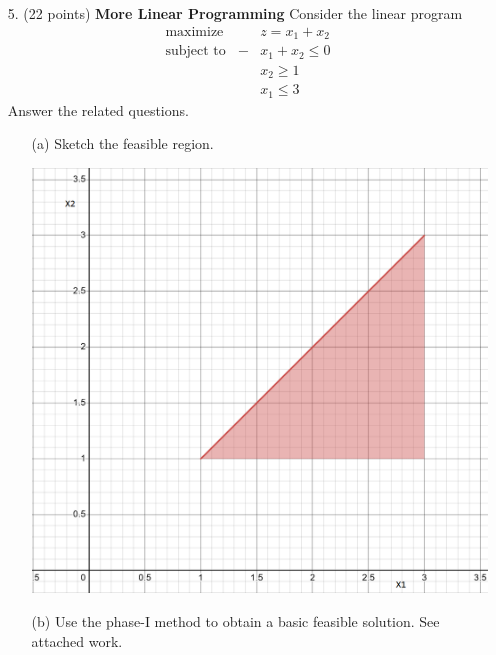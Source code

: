 \documentclass{article}
\begin{document}
\begin{itemize}
    \item[5.] (22 points) \textbf{More Linear Programming}
    \newline\newline
    Consider the linear program
    \begin{align*}
        \text{maximize} \:\:\:\:\: &z = x_1 + x_2\\
        \text{subject to} \:\:\:\: -&x_1 + x_2 \leq 0\\
        &x_2 \geq 1\\
        &x_1 \leq 3
    \end{align*}
    Answer the related questions.
    \begin{itemize}
        \item[(a)] Sketch the feasible region.
        \newline\newline
        \begin{center}
            \includegraphics[scale = 0.4]{prob5Feasible_region}
        \end{center}

        \item[(b)] Use the phase-I method to obtain a basic feasible solution.
        \newline\newline
        See attached work.
        \newline


\end{itemize}
\end{itemize}
\end{document}
